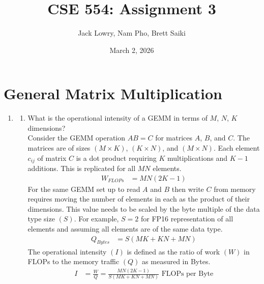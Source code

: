 \documentclass[12pt]{article}
\title{CSE 554: Assignment 3}
\author{Jack Lowry, Nam Pho, Brett Saiki}
\date{March 2, 2026}
\begin{document}
\pagestyle{fancy}

\fancyhead{} %

\fancyfoot{} %
\fancyfoot[CO]{\thepage}

\maketitle

\section{General Matrix Multiplication}

\begin{enumerate}[label=\textbf{Q\arabic*.}]
    \item 
    \begin{enumerate}
        \item What is the operational intensity of a GEMM in terms of $M$, $N$, $K$ dimensions? \\

        Consider the GEMM operation $AB=C$ for matrices $A$, $B$, and $C$. The matrices are of sizes $(M\times K)$, $(K\times N)$, and $(M\times N)$. Each element $c_{ij}$ of matrix $C$ is a dot product
        requiring $K$ multiplications and $K - 1$ additions. This is replicated for all $MN$ elements.
        \begin{align*}
            W_{FLOPs} &= MN\left(2K-1\right)
        \end{align*}
        For the same GEMM set up to read $A$ and $B$ then write $C$ from memory requires moving the number of elements in each as the product of their dimensions. This value needs to be scaled by the byte multiple of the data type size $(S)$. For example, $S=2$ for FP16 representation of all elements and assuming all elements are of the same data type.
        \begin{align*}
            Q_{Bytes} &= S\left(MK + KN + MN\right)
        \end{align*}
        The operational intensity $(I)$ is defined as the ratio of work $(W)$ in FLOPs to the memory traffic $(Q)$ as measured in Bytes.
        \begin{align*}
            I &= \frac{W}{Q} = \boxed{\frac{MN\left(2K-1\right)}{S\left(MK + KN + MN\right)}} \text{ FLOPs per Byte}
        \end{align*}


\end{enumerate}
\end{enumerate}
\end{document}
